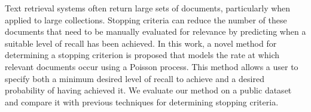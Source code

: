 Text retrieval systems often return large sets of  documents, particularly when applied to large collections. Stopping criteria can reduce the number of these documents that need to be manually evaluated for relevance by predicting when a suitable level of recall has been achieved. In this work, a novel method for determining a stopping criterion is proposed that models the rate at which relevant documents occur using a Poisson process. This method allows a user to specify both a minimum desired level of recall to achieve and a desired probability of having achieved it. We evaluate our method on a public dataset and compare it with previous techniques for determining stopping criteria.